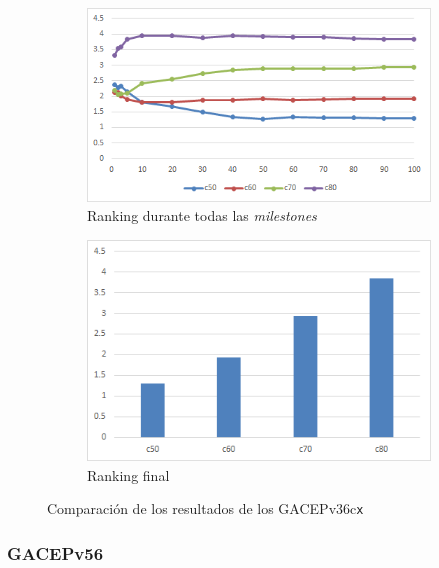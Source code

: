 \begin{figure}[h]
     \centering
     \begin{subfigure}[b]{0.45\textwidth}
         \centering
         \includegraphics[width=\textwidth]{imagenes/Experimental/GACEPv36.png}
         \caption{Ranking durante todas las \textit{milestones}}
         \label{fig:GACEPv36_lineas}
     \end{subfigure}
     \hfill
     \begin{subfigure}[b]{0.45\textwidth}
         \centering
         \includegraphics[width=\textwidth]{imagenes/Experimental/barras/GACEPv36.png}
         \caption{Ranking final}
         \label{fig:GACEPv36_barras}
     \end{subfigure}
        \caption{Comparación de los resultados de los GACEPv36c\texttt{x}}
        \label{fig:GACEPv36}
\end{figure}

\subsubsection{GACEPv56}

